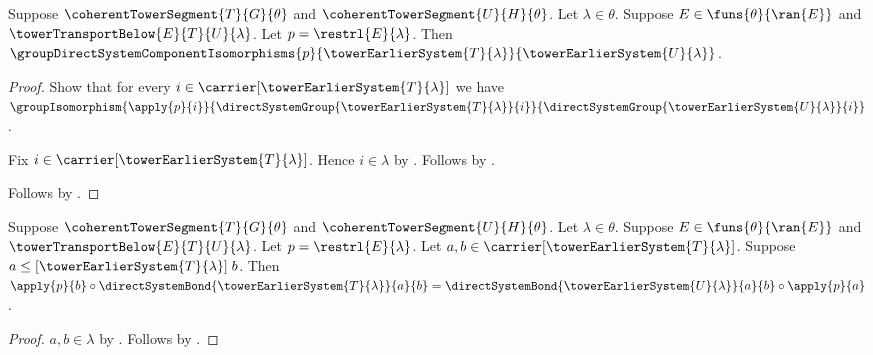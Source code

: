 \begin{proposition}\label{tower_transport_restriction_component_isomorphisms}
    Suppose $\coherentTowerSegment{T}{G}{\theta}$ and
        $\coherentTowerSegment{U}{H}{\theta}$.
    Let $\lambda\in\theta$.
    Suppose $E\in\funs{\theta}{\ran{E}}$ and
        $\towerTransportBelow{E}{T}{U}{\lambda}$.
    Let $p=\restrl{E}{\lambda}$.
    Then $\groupDirectSystemComponentIsomorphisms{p}
        {\towerEarlierSystem{T}{\lambda}}
        {\towerEarlierSystem{U}{\lambda}}$.
\end{proposition}
\begin{proof}
    Show that for every
        $i\in\carrier[\towerEarlierSystem{T}{\lambda}]$ we have
        $\groupIsomorphism{\apply{p}{i}}
            {\directSystemGroup{\towerEarlierSystem{T}{\lambda}}{i}}
            {\directSystemGroup{\towerEarlierSystem{U}{\lambda}}{i}}$.
    \begin{subproof}
        Fix $i\in\carrier[\towerEarlierSystem{T}{\lambda}]$.
        Hence $i\in\lambda$ by .
        Follows by .
    \end{subproof}
    Follows by
        .
\end{proof}

\begin{proposition}\label{tower_transport_restriction_system_square}
    Suppose $\coherentTowerSegment{T}{G}{\theta}$ and
        $\coherentTowerSegment{U}{H}{\theta}$.
    Let $\lambda\in\theta$.
    Suppose $E\in\funs{\theta}{\ran{E}}$ and
        $\towerTransportBelow{E}{T}{U}{\lambda}$.
    Let $p=\restrl{E}{\lambda}$.
    Let $a,b\in\carrier[\towerEarlierSystem{T}{\lambda}]$.
    Suppose $a\mathrel{
        \leq[\towerEarlierSystem{T}{\lambda}]}b$.
    Then $\apply{p}{b}\circ
            \directSystemBond{\towerEarlierSystem{T}{\lambda}}{a}{b}=
        \directSystemBond{\towerEarlierSystem{U}{\lambda}}{a}{b}
            \circ\apply{p}{a}$.
\end{proposition}
\begin{proof}
    $a,b\in\lambda$ by .
    Follows by .
\end{proof}

